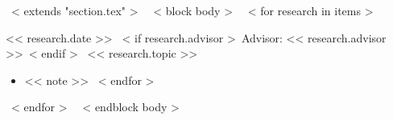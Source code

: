 ~< extends "section.tex" >~
~< block body >~
  ~< for research in items >~
    \begin{samepage}
      \cventry
        {<< research.date >>}
        {~< if research.advisor >~Advisor: << research.advisor >>~< endif >~}
        {<< research.topic >>}
        {}
        {}
        {
          \begin{itemize}
            ~< for note in research.notes >~
              \item{<< note >>}
            ~< endfor >~
          \end{itemize}
        }
    \end{samepage}
    \vspace{10pt}
  ~< endfor >~
  \vspace{-10pt}
~< endblock body >~
